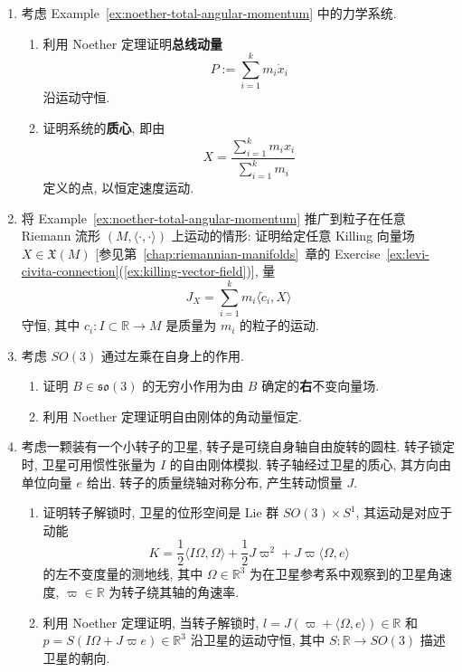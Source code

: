 \begin{RiemannExercise}
\begin{enumerate}[label=(\arabic*),ref=\arabic*,leftmargin=*]
\begin{enumerate}[label=(\alph*),leftmargin=*]
\[\begin{cases}
  \end{cases},
\]
并证明当
\[
  \frac{1}{2}\left(1-\frac{\sqrt{69}}{9}\right)<\mu
  <\frac{1}{2}\left(1+\frac{\sqrt{69}}{9}\right)
\]
时, 这些平衡点不稳定.
\end{enumerate}
\item\label{ex:noether-total-linear-momentum}
考虑 Example~\ref{ex:noether-total-angular-momentum} 中的力学系统.
\begin{enumerate}[label=(\alph*),leftmargin=*]
\item 利用 Noether 定理证明\textbf{总线动量}
\[
  P:=\sum_{i=1}^k m_i\dot x_i
\]
沿运动守恒.
\item 证明系统的\textbf{质心}, 即由
\[
  X=\frac{\sum_{i=1}^k m_ix_i}{\sum_{i=1}^k m_i}
\]
定义的点, 以恒定速度运动.
\end{enumerate}
\item\label{ex:killing-field-conserved-quantity}
将 Example~\ref{ex:noether-total-angular-momentum} 推广到粒子在任意 Riemann 流形 $(M,\langle\cdot,\cdot\rangle)$ 上运动的情形: 证明给定任意 Killing 向量场 $X\in\mathfrak{X}(M)$ [参见第~\ref{chap:riemannian-manifolds}~章的 Exercise~\ref{ex:levi-civita-connection}(\ref{ex:killing-vector-field})], 量
\[
  J_X=\sum_{i=1}^k m_i\langle\dot c_i,X\rangle
\]
守恒, 其中 $c_i:I\subset\mathbb{R}\to M$ 是质量为 $m_i$ 的粒子的运动.
\item\label{ex:noether-for-free-rigid-body}
考虑 $SO(3)$ 通过左乘在自身上的作用.
\begin{enumerate}[label=(\alph*),leftmargin=*]
\item 证明 $B\in\mathfrak{so}(3)$ 的无穷小作用为由 $B$ 确定的\textbf{右}不变向量场.
\item {}\label{idx:noether-rigid-body-angular-momentum}利用 Noether 定理证明自由刚体的角动量恒定.
\end{enumerate}
\item\label{ex:satellite-with-rotor}
考虑一颗装有一个小转子的卫星, 转子是可绕自身轴自由旋转的圆柱. 转子锁定时, 卫星可用惯性张量为 $I$ 的自由刚体模拟. 转子轴经过卫星的质心, 其方向由单位向量 $e$ 给出. 转子的质量绕轴对称分布, 产生转动惯量 $J$.
\begin{enumerate}[label=(\alph*),leftmargin=*]
\item 证明转子解锁时, 卫星的位形空间是 Lie 群 $SO(3)\times S^1$, 其运动是对应于动能
\[
  K=\frac{1}{2}\langle I\Omega,\Omega\rangle+\frac{1}{2}J\varpi^2+J\varpi\langle\Omega,e\rangle
\]
的左不变度量的测地线, 其中 $\Omega\in\mathbb{R}^3$ 为在卫星参考系中观察到的卫星角速度, $\varpi\in\mathbb{R}$ 为转子绕其轴的角速率.
\item 利用 Noether 定理证明, 当转子解锁时, $l=J(\varpi+\langle\Omega,e\rangle)\in\mathbb{R}$ 和 $p=S(I\Omega+J\varpi e)\in\mathbb{R}^3$ 沿卫星的运动守恒, 其中 $S:\mathbb{R}\to SO(3)$ 描述卫星的朝向.
\end{enumerate}
\end{enumerate}
\end{RiemannExercise}
